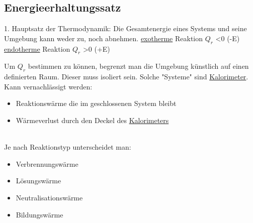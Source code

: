 \subsection{Energieerhaltungssatz}
1. Hauptsatz der Thermodynamik: \newline
Die Gesamtenergie eines Systems und seine Umgebung kann weder zu, noch abnehmen.\newline
\hyperref[sec:endo_exotherm]{exotherme} Reaktion $Q_r$ \textless 0 (-E) \newline
\hyperref[sec:endo_exotherm]{endotherme} Reaktion $Q_r$ \textgreater 0 (+E)

Um $Q_r$ bestimmen zu können, begrenzt man die Umgebung künstlich auf einen definierten Raum.
Dieser muss isoliert sein.
Solche "Systeme" sind \hyperref[sec:kalorimeter]{Kalorimeter}. \\ 
Kann vernachlässigt werden: 

\begin{itemize}
    \item Reaktionswärme die im geschlossenen System bleibt
    \item Wärmeverlust durch den Deckel des \hyperref[sec:kalorimeter]{Kalorimeters}
\end{itemize} 
\ \\
Je nach Reaktionstyp unterscheidet man:

\begin{multicols}{4}
    \begin{itemize}
        \item Verbrennungswärme
        \item Lösungswärme
        \item Neutralisationswärme
        \item Bildungswärme
    \end{itemize}
\end{multicols}
